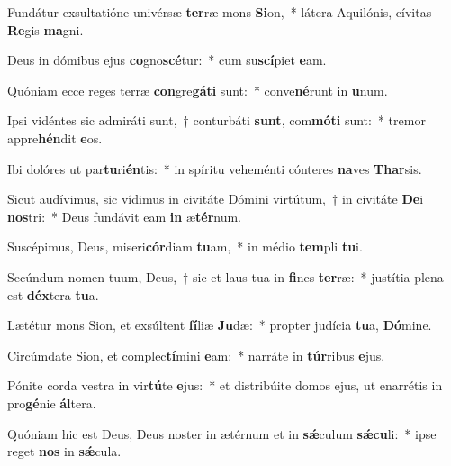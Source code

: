 \item Fundátur exsultatióne univérsæ \textbf{ter}ræ mons \textbf{Si}on,~* látera Aquilónis, cívitas \textbf{Re}gis \textbf{ma}gni.
\item Deus in dómibus ejus \textbf{co}gno\textbf{scé}tur:~* cum su\textbf{scí}piet \textbf{e}am.
\item Quóniam ecce reges terræ \textbf{con}gre\textbf{gá}\textbf{ti} sunt:~* conve\textbf{né}runt in \textbf{u}num.
\item Ipsi vidéntes sic admiráti sunt,~† conturbáti \textbf{sunt}, com\textbf{mó}\textbf{ti} sunt:~* tremor appre\textbf{hén}dit \textbf{e}os.
\item Ibi dolóres ut par\textbf{tu}ri\textbf{én}tis:~* in spíritu veheménti cónteres \textbf{na}ves \textbf{Thar}sis.
\item Sicut audívimus, sic vídimus in civitáte Dómini virtútum,~† in civitáte \textbf{De}i \textbf{nos}tri:~* Deus fundávit eam \textbf{in} æ\textbf{tér}num.
\item Suscépimus, Deus, miseri\textbf{cór}diam \textbf{tu}am,~* in médio \textbf{tem}pli \textbf{tu}i.
\item Secúndum nomen tuum, Deus,~† sic et laus tua in \textbf{fi}nes \textbf{ter}ræ:~* justítia plena est \textbf{déx}tera \textbf{tu}a.
\item Lætétur mons Sion, et exsúltent \textbf{fí}liæ \textbf{Ju}dæ:~* propter judícia \textbf{tu}a, \textbf{Dó}mine.
\item Circúmdate Sion, et complec\textbf{tí}mini \textbf{e}am:~* narráte in \textbf{túr}ribus \textbf{e}jus.
\item Pónite corda vestra in vir\textbf{tú}te \textbf{e}jus:~* et distribúite domos ejus, ut enarrétis in pro\textbf{gé}nie \textbf{ál}tera.
\item Quóniam hic est Deus, Deus noster in ætérnum et in \textbf{sǽ}culum \textbf{sǽ}\textbf{cu}li:~* ipse reget \textbf{nos} in \textbf{sǽ}cula.
